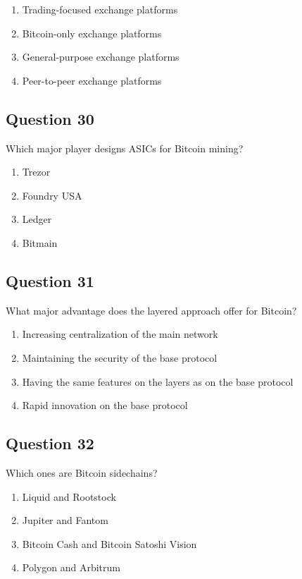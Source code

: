 \documentclass[12pt,a4paper]{article}
\begin{document}
\begin{enumerate}[label=\Alph*., leftmargin=*]
\item Trading-focused exchange platforms
\item Bitcoin-only exchange platforms
\item General-purpose exchange platforms
\item Peer-to-peer exchange platforms
\end{enumerate}

\bigskip


\subsection*{Question 30}
Which major player designs ASICs for Bitcoin mining?

\begin{enumerate}[label=\Alph*., leftmargin=*]
\item Trezor
\item Foundry USA
\item Ledger
\item Bitmain
\end{enumerate}

\bigskip


\subsection*{Question 31}
What major advantage does the layered approach offer for Bitcoin?

\begin{enumerate}[label=\Alph*., leftmargin=*]
\item Increasing centralization of the main network
\item Maintaining the security of the base protocol
\item Having the same features on the layers as on the base protocol
\item Rapid innovation on the base protocol
\end{enumerate}

\bigskip


\subsection*{Question 32}
Which ones are Bitcoin sidechains?

\begin{enumerate}[label=\Alph*., leftmargin=*]
\item Liquid and Rootstock
\item Jupiter and Fantom
\item Bitcoin Cash and Bitcoin Satoshi Vision
\item Polygon and Arbitrum
\end{enumerate}
\end{document}

